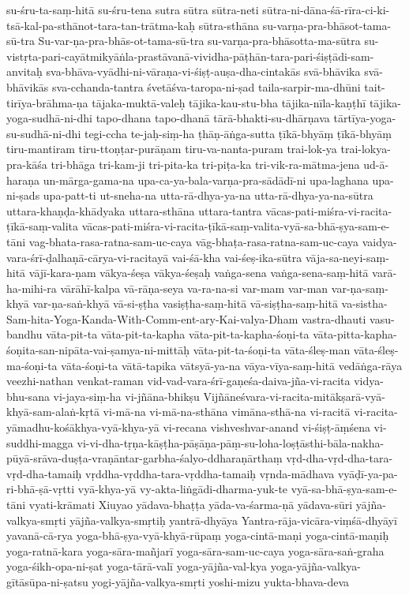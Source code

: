 {su-śru-ta-saṃ-hitā
su-śru-tena
sutra
sūtra
sūtra-neti
sūtra-ni-dāna-śā-rīra-ci-ki-tsā-kal-pa-sthānot-tara-tan-trātma-kaḥ
sūtra-sthāna
su-varṇa-pra-bhāsot-tama-sū-tra
Su-var-ṇa-pra-bhās-ot-tama-sū-tra
su-varṇa-pra-bhāsotta-ma-sūtra
su-vistṛta-pari-cayātmikyāṅla-prastāvanā-vividha-pāṭhān-tara-pari-śiṣṭādi-sam-anvitaḥ
sva-bhāva-vyādhi-ni-vāraṇa-vi-śiṣṭ-auṣa-dha-cintakās
svā-bhāvika
svā-bhāvikās
sva-cchanda-tantra
śvetāśva-taropa-ni-ṣad
taila-sarpir-ma-dhūni
tait-tirīya-brāhma-ṇa
tājaka-muktā-valeḥ
tājika-kau-stu-bha
tājika-nīla-kaṇṭhī
tājika-yoga-sudhā-ni-dhi
tapo-dhana
tapo-dhanā
tārā-bhakti-su-dhārṇava
tārtīya-yoga-su-sudhā-ni-dhi
tegi-ccha
te-jaḥ-siṃ-ha
ṭhāṇ-āṅga-sutta
ṭīkā-bhyāṃ
ṭīkā-bhyāṃ
tiru-mantiram
tiru-ttoṇṭar-purāṇam
tiru-va-nanta-puram
trai-lok-ya
trai-lokya-pra-kāśa
tri-bhāga
tri-kam-ji
tri-pita-ka
tri-piṭa-ka
tri-vik-ra-mātma-jena
ud-ā-haraṇa
un-mārga-gama-na
upa-ca-ya-bala-varṇa-pra-sādādī-ni
upa-laghana
upa-ni-ṣads
upa-patt-ti
ut-sneha-na
utta-rā-dhya-ya-na
utta-rā-dhya-ya-na-sūtra
uttara-khaṇḍa-khādyaka
uttara-sthāna
uttara-tantra
vācas-pati-miśra-vi-racita-ṭīkā-saṃ-valita
vācas-pati-miśra-vi-racita-ṭīkā-saṃ-valita-vyā-sa-bhā-ṣya-sam-e-tāni
vag-bhata-rasa-ratna-sam-uc-caya
vāg-bhaṭa-rasa-ratna-sam-uc-caya
vaidya-vara-śrī-ḍalhaṇā-cārya-vi-racitayā
vai-śā-kha
vai-śeṣ-ika-sūtra
vāja-sa-neyi-saṃ-hitā
vājī-kara-ṇam
vākya-śeṣa
vākya-śeṣaḥ
vaṅga-sena
vaṅga-sena-saṃ-hitā
varā-ha-mihi-ra
vārāhī-kalpa
vā-rāṇa-seya
va-ra-na-si
var-mam
var-man
var-ṇa-saṃ-khyā
var-ṇa-saṅ-khyā
vā-si-ṣṭha
vasiṣṭha-saṃ-hitā
vā-siṣṭha-saṃ-hitā
va-sistha-Sam-hita-Yoga-Kanda-With-Comm-ent-ary-Kai-valya-Dham
vastra-dhauti
vasu-bandhu
vāta-pit-ta
vāta-pit-ta-kapha
vāta-pit-ta-kapha-śoṇi-ta
vāta-pitta-kapha-śoṇita-san-nipāta-vai-ṣamya-ni-mittāḥ
vāta-pit-ta-śoṇi-ta
vāta-śleṣ-man
vāta-śleṣ-ma-śoṇi-ta
vāta-śoṇi-ta
vātā-tapika
vātsyā-ya-na
vāya-vīya-saṃ-hitā
vedāṅga-rāya
veezhi-nathan
venkat-raman
vid-vad-vara-śrī-gaṇeśa-daiva-jña-vi-racita
vidya-bhu-sana
vi-jaya-siṃ-ha
vi-jñāna-bhikṣu
Vijñāneśvara-vi-racita-mitākṣarā-vyā-khyā-sam-alaṅ-kṛtā
vi-mā-na
vi-mā-na-sthāna
vimāna-sthā-na
vi-racitā
vi-racita-yāmadhu-kośākhya-vyā-khya-yā
vi-recana
vishveshvar-anand
vi-śiṣṭ-āṃśena
vi-suddhi-magga
vi-vi-dha-tṛṇa-kāṣṭha-pāṣāṇa-pāṃ-su-loha-loṣṭāsthi-bāla-nakha-pūyā-srāva-duṣṭa-vraṇāntar-garbha-śalyo-ddharaṇārthaṃ
vṛd-dha-vṛd-dha-tara-vṛd-dha-tamaiḥ
vṛddha-vṛddha-tara-vṛddha-tamaiḥ
vṛnda-mādhava
vyāḍī-ya-pa-ri-bhā-ṣā-vṛtti
vyā-khya-yā
vy-akta-liṅgādi-dharma-yuk-te
vyā-sa-bhā-ṣya-sam-e-tāni
vyati-krāmati
Xiuyao
yādava-bhaṭṭa
yāda-va-śarma-ṇā
yādava-sūri
yājña-valkya-smṛti
yājña-valkya-smṛtiḥ
yantrā-dhyāya
Yantra-rāja-vicāra-viṃśā-dhyāyī
yavanā-cā-rya
yoga-bhā-ṣya-vyā-khyā-rūpaṃ
yoga-cintā-maṇi
yoga-cintā-maṇiḥ
yoga-ratnā-kara
yoga-sāra-mañjarī
yoga-sāra-sam-uc-caya
yoga-sāra-saṅ-graha
yoga-śikh-opa-ni-ṣat
yoga-tārā-valī
yoga-yājña-val-kya
yoga-yājña-valkya-gītāsūpa-ni-ṣatsu
yogi-yājña-valkya-smṛti
yoshi-mizu
yukta-bhava-deva
}
